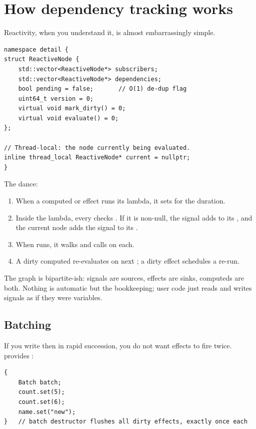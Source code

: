 \section{How dependency tracking works}

Reactivity, when you understand it, is almost embarrassingly simple.

\begin{lstlisting}
namespace detail {
struct ReactiveNode {
    std::vector<ReactiveNode*> subscribers;
    std::vector<ReactiveNode*> dependencies;
    bool pending = false;       // O(1) de-dup flag
    uint64_t version = 0;
    virtual void mark_dirty() = 0;
    virtual void evaluate() = 0;
};

// Thread-local: the node currently being evaluated.
inline thread_local ReactiveNode* current = nullptr;
}
\end{lstlisting}

The dance:

\begin{enumerate}[leftmargin=*]
  \item When a computed or effect runs its lambda, it sets
     for the duration.
  \item Inside the lambda, every  checks
    . If it is non-null, the signal adds
     to its , and the current node
    adds the signal to its .
  \item When  runs, it walks
     and calls  on each.
  \item A dirty computed re-evaluates on next ; a
    dirty effect schedules a re-run.
\end{enumerate}

The graph is bipartite-ish: signals are sources, effects are sinks,
computeds are both. Nothing is automatic but the bookkeeping; user
code just reads and writes signals as if they were variables.

\subsection{Batching}

If you write  then  in rapid
succession, you do not want effects to fire twice. \maya{} provides
:

\begin{lstlisting}
{
    Batch batch;
    count.set(5);
    count.set(6);
    name.set("new");
}   // batch destructor flushes all dirty effects, exactly once each
\end{lstlisting}

